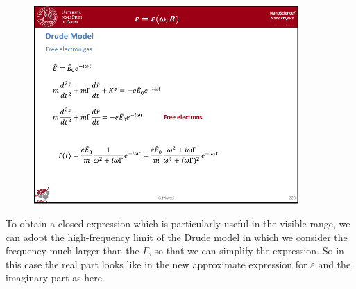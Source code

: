 \documentclass[../main/main.tex]{subfiles}
\begin{document}
\begin{figure}[h!]
\centering
\includegraphics[page=3,width=0.9\textwidth]{../lessons/pdf_file/15_lesson.pdf}
\end{figure}

To obtain a closed expression which is particularly useful in the visible range, we can adopt the high-frequency limit of the Drude model in which we consider the frequency much larger than the \( \Gamma  \), so that we can simplify the expression.
So in this case the real part looks like in the new approximate expression for \( \varepsilon  \) and the imaginary part as here.
\end{document}
